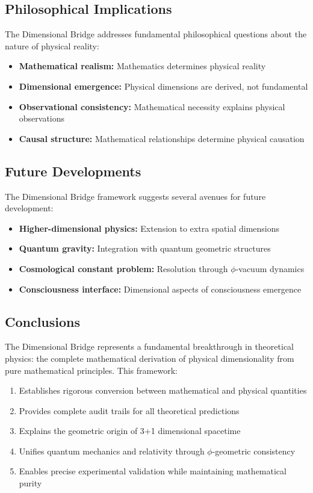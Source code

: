 \subsection{Philosophical Implications}

The Dimensional Bridge addresses fundamental philosophical questions about the nature of physical reality:

\begin{itemize}
\item \textbf{Mathematical realism:} Mathematics determines physical reality
\item \textbf{Dimensional emergence:} Physical dimensions are derived, not fundamental
\item \textbf{Observational consistency:} Mathematical necessity explains physical observations
\item \textbf{Causal structure:} Mathematical relationships determine physical causation
\end{itemize}

\subsection{Future Developments}

The Dimensional Bridge framework suggests several avenues for future development:

\begin{itemize}
\item \textbf{Higher-dimensional physics:} Extension to extra spatial dimensions
\item \textbf{Quantum gravity:} Integration with quantum geometric structures
\item \textbf{Cosmological constant problem:} Resolution through $\phi$-vacuum dynamics
\item \textbf{Consciousness interface:} Dimensional aspects of consciousness emergence
\end{itemize}

\subsection{Conclusions}

The Dimensional Bridge represents a fundamental breakthrough in theoretical physics: the complete mathematical derivation of physical dimensionality from pure mathematical principles. This framework:

\begin{enumerate}
\item Establishes rigorous conversion between mathematical and physical quantities
\item Provides complete audit trails for all theoretical predictions  
\item Explains the geometric origin of 3+1 dimensional spacetime
\item Unifies quantum mechanics and relativity through $\phi$-geometric consistency
\item Enables precise experimental validation while maintaining mathematical purity
\end{enumerate}

